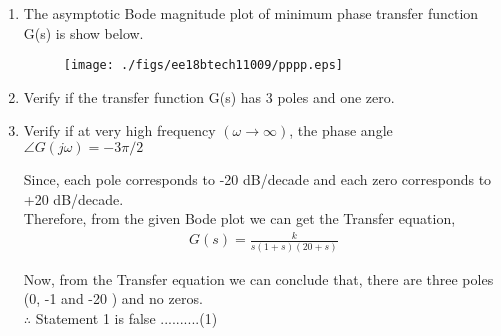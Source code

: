 \begin{enumerate}[label=\thesubsection.\arabic*.,ref=\thesubsection.\theenumi]
\item 
The asymptotic Bode magnitude plot of  minimum phase transfer function
G(s) is show below.\\
\begin{figure}[htp]
	\centering
	\texttt{[image: ./figs/ee18btech11009/pppp.eps]}
	\caption{}
	\label{fig:galaxy}
\end{figure} 
\item Verify if the transfer function G(s) has 3 poles and one zero.
\item  Verify if at very high frequency $(\omega \to \infty)$, the phase angle $ \angle G(j\omega)=-3\pi/2$
\solution

Since, each pole corresponds to -20 dB/decade  
and each zero corresponds to +20 dB/decade.\\
Therefore, from the given Bode plot we can get the Transfer equation,
\begin{align}
G(s) = \frac{k}{s(1+s)(20+s)}
\end{align}

Now, from the Transfer equation we can conclude that,
there are three poles (0, -1 and -20 ) and no zeros.\\

$\therefore$ Statement 1 is false  ..........(1)\\ \\



\end{enumerate}
